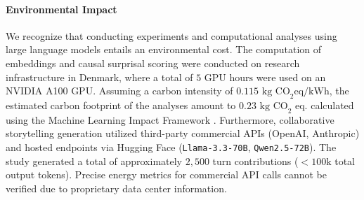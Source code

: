 \documentclass[11pt]{article}
\begin{document}
\paragraph{Environmental Impact}
We recognize that conducting experiments and computational analyses using large language models entails an environmental cost. The computation of embeddings and causal surprisal scoring were conducted on research infrastructure in Denmark, where a total of $5\text{ GPU hours}$ were used on an NVIDIA A100 GPU. Assuming a carbon intensity of $0.115\text{ kg CO}_2\text{eq/kWh}$, the estimated carbon footprint of the analyses amount to $0.23 \text{ kg CO}_2$ eq. calculated using the Machine Learning Impact Framework \cite{lacoste2019quantifyingcarbonemissionsmachine}.
Furthermore, collaborative storytelling generation utilized third-party commercial APIs (OpenAI, Anthropic) and hosted endpoints via Hugging Face (\texttt{Llama-3.3-70B}, \texttt{Qwen2.5-72B}). The study generated a total of approximately $2,500$ turn contributions ($<100\text{k}$ total output tokens). Precise energy metrics for commercial API calls cannot be verified due to proprietary data center information.



\end{document}
